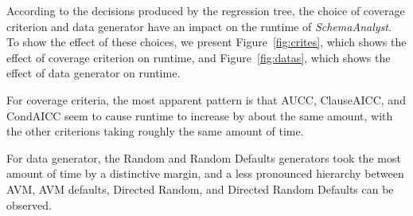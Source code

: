 
According to the decisions produced by the regression tree, the choice of coverage criterion and data generator have an
impact on the runtime of \textit{SchemaAnalyst}. To show the effect of these choices, we present
Figure~\ref{fig:crites}, which shows the effect of coverage criterion on runtime, and Figure~\ref{fig:datas}, which
shows the effect of data generator on runtime.

For coverage criteria, the most apparent pattern is that AUCC, ClauseAICC, and CondAICC seem to cause runtime to
increase by about the same amount, with the other criterions taking roughly the same amount of time.

For data generator, the Random and Random Defaults generators took the most amount of time by a distinctive margin, and
a less pronounced hierarchy between AVM, AVM defaults, Directed Random, and Directed Random Defaults can be observed.
